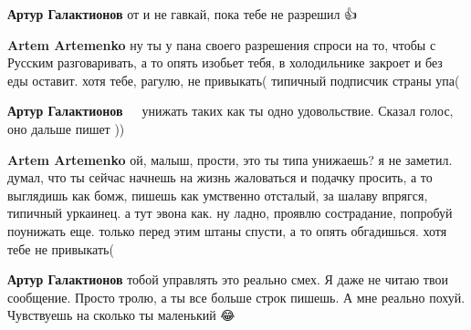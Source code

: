 \begin{itemize}
\begin{itemize}
 
\textbf{Артур Галактионов} от и не гавкай, пока тебе не разрешил 👍

 
\textbf{Artem Artemenko} ну ты у пана своего разрешения спроси на то, чтобы с Русским разговаривать, а то опять изобьет тебя, в холодильнике закроет и без еды оставит. хотя тебе, рагулю, не привыкать( типичный подписчик страны упа(

 
\textbf{Артур Галактионов} 🤣🤣🤣 унижать таких как ты одно удовольствие.
Сказал голос, оно дальше пишет ))

 
\textbf{Artem Artemenko} ой, малыш, прости, это ты типа унижаешь? я не заметил. думал, что ты сейчас начнешь на жизнь жаловаться и подачку просить, а то выглядишь как бомж, пишешь как умственно отсталый, за шалаву впрягся, типичный уркаинец. а тут эвона как.
ну ладно, проявлю сострадание, попробуй поунижать еще. только перед этим штаны спусти, а то опять обгадишься. хотя тебе не привыкать(

 
\textbf{Артур Галактионов} тобой управлять это реально смех.
Я даже не читаю твои сообщение. Просто тролю, а ты все больше строк пишешь.
А мне реально похуй.
Чувствуешь на сколько ты маленький 😂


\end{itemize}
\end{itemize}
